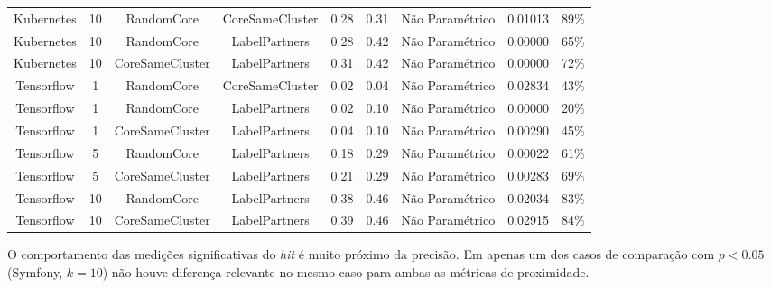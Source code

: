 \documentclass[12pt,openany,oneside,a4paper,english,brazil]{abntbibufjf}
\begin{document}
\begin{table}[htbp]
\begin{center}
{\begin{tabular}{|c|c|c|c|c|c|c|c|c|}
   Kubernetes       & 10         & RandomCore        & CoreSameCluster   & 0.28             & 0.31             & Não Paramétrico        & 0.01013          & 89\%               \\
   Kubernetes       & 10         & RandomCore        & LabelPartners     & 0.28             & 0.42             & Não Paramétrico        & 0.00000          & 65\%               \\
   Kubernetes       & 10         & CoreSameCluster   & LabelPartners     & 0.31             & 0.42             & Não Paramétrico        & 0.00000          & 72\%               \\
   Tensorflow       & 1          & RandomCore        & CoreSameCluster   & 0.02             & 0.04             & Não Paramétrico        & 0.02834          & 43\%               \\
   Tensorflow       & 1          & RandomCore        & LabelPartners     & 0.02             & 0.10             & Não Paramétrico        & 0.00000          & 20\%               \\
   Tensorflow       & 1          & CoreSameCluster   & LabelPartners     & 0.04             & 0.10             & Não Paramétrico        & 0.00290          & 45\%               \\
   Tensorflow       & 5          & RandomCore        & LabelPartners     & 0.18             & 0.29             & Não Paramétrico        & 0.00022          & 61\%               \\
   Tensorflow       & 5          & CoreSameCluster   & LabelPartners     & 0.21             & 0.29             & Não Paramétrico        & 0.00283          & 69\%               \\
   Tensorflow       & 10         & RandomCore        & LabelPartners     & 0.38             & 0.46             & Não Paramétrico        & 0.02034          & 83\%               \\
   Tensorflow       & 10         & CoreSameCluster   & LabelPartners     & 0.39             & 0.46             & Não Paramétrico        & 0.02915          & 84\%
   \end{tabular}%
   }
   \hline


 \label{tab:resultados-hit}
 \end{center}
 \end{table}

 O comportamento das medições significativas do \textit{hit} é muito próximo da precisão. Em apenas um dos casos de comparação com $p < 0.05$ (Symfony, $k = 10$) não houve diferença relevante no mesmo caso para ambas as métricas de proximidade.
\end{document}
